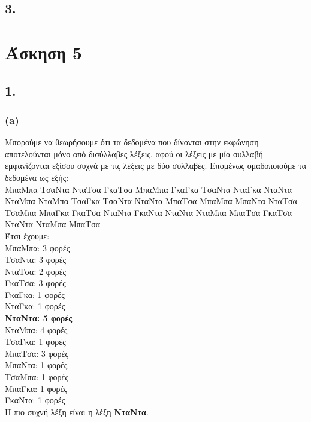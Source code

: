 \documentclass[12pt,a4paper]{article}
\begin{document}
		
		\subsection*{3.}
			
	
	\section*{Άσκηση 5} 
		
		\subsection*{1.}
		
			\subsubsection*{(a)}
				Μπορούμε να θεωρήσουμε ότι τα δεδομένα που δίνονται στην εκφώνηση αποτελούνται μόνο από δισύλλαβες λέξεις, αφού οι λέξεις με μία συλλαβή εμφανίζονται εξίσου συχνά με τις λέξεις με δύο συλλαβές. Επομένως ομαδοποιούμε τα δεδομένα ως εξής: \\
				
				ΜπαΜπα ΤσαΝτα ΝταΤσα ΓκαΤσα ΜπαΜπα ΓκαΓκα ΤσαΝτα ΝταΓκα ΝταΝτα ΝταΜπα ΝταΜπα ΤσαΓκα ΤσαΝτα ΝταΝτα ΜπαΤσα ΜπαΜπα ΜπαΝτα ΝταΤσα ΤσαΜπα ΜπαΓκα ΓκαΤσα ΝταΝτα ΓκαΝτα ΝταΝτα ΝταΜπα ΜπαΤσα ΓκαΤσα ΝταΝτα ΝταΜπα ΜπαΤσα \\
				
				Έτσι έχουμε: \\

				ΜπαΜπα: 3 φορές \\
				ΤσαΝτα: 3 φορές \\
				ΝταΤσα: 2 φορές \\
				ΓκαΤσα: 3 φορές \\
				ΓκαΓκα: 1 φορές \\
				ΝταΓκα: 1 φορές \\
				\textbf{ΝταΝτα: 5 φορές} \\
				ΝταΜπα: 4 φορές \\
				ΤσαΓκα: 1 φορές \\
				ΜπαΤσα: 3 φορές \\
				ΜπαΝτα: 1 φορές \\
				ΤσαΜπα: 1 φορές \\
				ΜπαΓκα: 1 φορές \\
				ΓκαΝτα: 1 φορές \\
				
				Η πιο συχνή λέξη είναι η λέξη \textbf{ΝταΝτα}.
		
\end{document}
